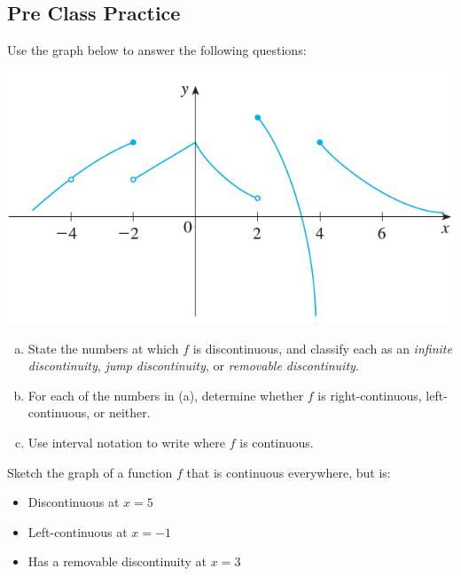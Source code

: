 \documentclass[notes]{subfiles}
\begin{document}
	\subsection*{Pre Class Practice}
		\begin{ex}
			Use the graph below to answer the following questions:\\
			\begin{minipage}{3in}
				\includegraphics[scale = .58]{2.4fig1}
			\end{minipage}
			\begin{minipage}{3.8in}
				\begin{enumerate}[(a)]
					\item State the numbers at which \(f\) is discontinuous, and classify each as an \emph{infinite discontinuity}, \emph{jump discontinuity}, or \emph{removable discontinuity}.
					\item For each of the numbers in (a), determine whether \(f\) is right-continuous, left-continuous, or neither.  
					\item Use interval notation to write where \(f\) is continuous.
				\end{enumerate}
			\end{minipage}
		\end{ex}
			
		\begin{ex}
			Sketch the graph of a function \(f\) that is continuous everywhere, but is:
				\begin{itemize}
					\item Discontinuous at \(x = 5\)
					\item Left-continuous at \(x = -1\)
					\item Has a removable discontinuity at \(x = 3\)
				\end{itemize}
		\end{ex}
			\newpage
			
\end{document}
